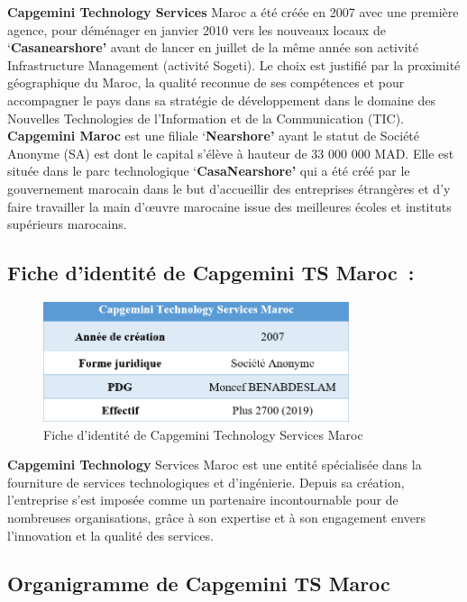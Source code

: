 \documentclass[12pt,a4paper,twoside]{report}
\begin{document}
\textbf{Capgemini Technology Services} Maroc a été créée en 2007 avec
une première agence, pour déménager en janvier 2010 vers les nouveaux
locaux de `\textbf{Casanearshore'} avant de lancer en juillet de la même
année son activité Infrastructure Management (activité Sogeti). Le choix
est justifié par la proximité géographique du Maroc, la qualité reconnue
de ses compétences et pour accompagner le pays dans sa stratégie de
développement dans le domaine des Nouvelles Technologies de
l'Information et de la Communication (TIC). \textbf{Capgemini Maroc} est
une filiale `\textbf{Nearshore'} ayant le statut de Société Anonyme (SA)
est dont le capital s'élève à hauteur de 33 000 000 MAD. Elle est située
dans le parc technologique `\textbf{CasaNearshore'} qui a été créé par
le gouvernement marocain dans le but d'accueillir des entreprises
étrangères et d'y faire travailler la main d'œuvre marocaine issue des
meilleures écoles et instituts supérieurs marocains.

\hypertarget{fiche-didentituxe9-de-capgemini-ts-maroc}{%
\subsection{Fiche d'identité de Capgemini TS
Maroc~:}\label{fiche-didentituxe9-de-capgemini-ts-maroc}}

\begin{figure}[htbp]
    \centering
    \includegraphics[width=0.8\textwidth]{latex_media/media/image4.png}
    \caption{Fiche d'identité de Capgemini Technology Services Maroc}
    \label{fig:fiche-capgemini-ts}
\end{figure}

\textbf{Capgemini Technology} Services Maroc est une entité spécialisée dans la fourniture de services technologiques et d'ingénierie. Depuis sa création, l'entreprise s'est imposée comme un partenaire incontournable pour de nombreuses organisations, grâce à son expertise et à son engagement envers l'innovation et la qualité des services.

\hypertarget{organigramme-de-capgemini-ts-maroc}{%
\subsection{Organigramme de Capgemini TS
Maroc}\label{organigramme-de-capgemini-ts-maroc}}
\end{document}
